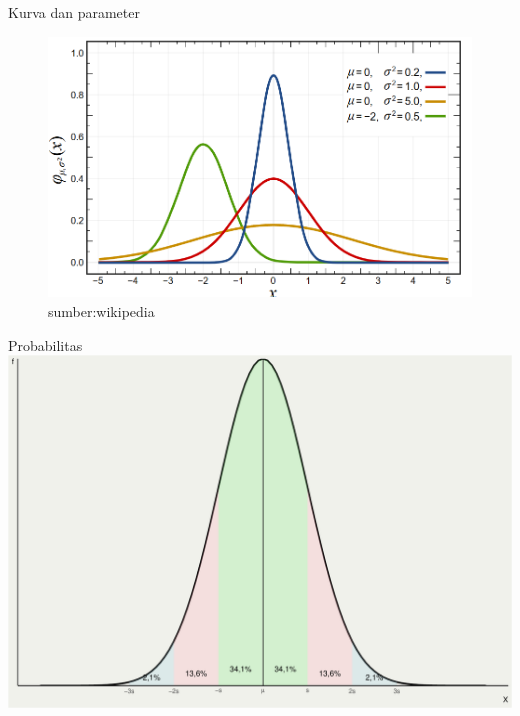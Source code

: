 \documentclass[
  ignorenonframetext,
]{beamer}
\begin{document}
\begin{frame}{Kurva dan parameter}
\label{kurva-dan-parameter}
\begin{figure}[H]

{\centering \includegraphics{normal.png}

}

\caption{sumber:wikipedia}

\end{figure}%
\end{frame}

\begin{frame}{Probabilitas}
\label{probabilitas}
\includegraphics{index_files/figure-beamer/unnamed-chunk-17-1.pdf}
\end{frame}
\end{document}
